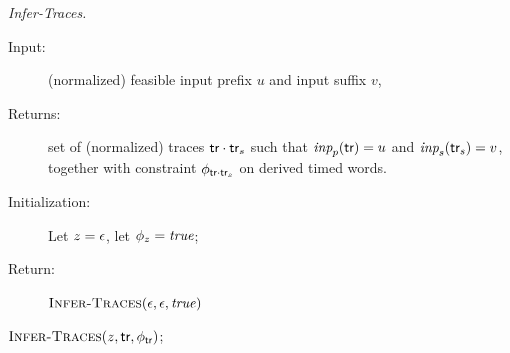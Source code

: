 \medskip
{} \textsl{Infer-Traces.}
\begin{description}
\item[Input:] (normalized) feasible input prefix $u$ and input suffix $v$,
\item[Returns:] set of (normalized) traces
$\textsf{tr}\cdot\textsf{tr}_s$ such that
$\textit{inp}_p(\textsf{tr}) = u$ and $\textit{inp}_s(\textsf{tr}_s) = v$, together with
  constraint $\phi_{\textsf{tr}\cdot\textsf{tr}_s}$ on derived timed words.
\item[Initialization:]
    Let $z = \epsilon$, let $\phi_{z} = {\it true}$;
\item[Return:]
    $\textsc{Infer-Traces}(\epsilon,\epsilon,{\it true})$
\end{description}
\medskip
{} $\textsc{Infer-Traces}(z,\textsf{tr},\phi_{\textsf{tr}})$;
